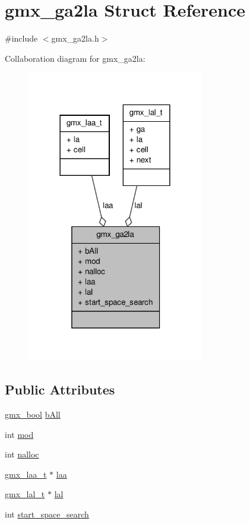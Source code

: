 \hypertarget{structgmx__ga2la}{\section{gmx\-\_\-ga2la \-Struct \-Reference}
\label{structgmx__ga2la}
}


{\ttfamily \#include $<$gmx\-\_\-ga2la.\-h$>$}



\-Collaboration diagram for gmx\-\_\-ga2la\-:
\nopagebreak
\begin{figure}[H]
\begin{center}
\leavevmode
\includegraphics[width=218pt]{structgmx__ga2la__coll__graph}
\end{center}
\end{figure}
\subsection*{\-Public \-Attributes}
\begin{DoxyCompactItemize}
\item 
\hyperlink{include_2types_2simple_8h_a8fddad319f226e856400d190198d5151}{gmx\-\_\-bool} \hyperlink{structgmx__ga2la_a03196e17ef59a80743c6937ed2a70fa4}{b\-All}
\item 
int \hyperlink{structgmx__ga2la_a6ea82b1614fae9a7348931f91d4cbd1c}{mod}
\item 
int \hyperlink{structgmx__ga2la_a2fc212a6fe9ebfdaa46de445c9de58ea}{nalloc}
\item 
\hyperlink{structgmx__laa__t}{gmx\-\_\-laa\-\_\-t} $\ast$ \hyperlink{structgmx__ga2la_a7dd6309c7305c6ae325c1d52d17ba600}{laa}
\item 
\hyperlink{structgmx__lal__t}{gmx\-\_\-lal\-\_\-t} $\ast$ \hyperlink{structgmx__ga2la_a92b7d8241c3c9fc9f325fe468ec9bb66}{lal}
\item 
int \hyperlink{structgmx__ga2la_ace52eb5ca70dde273e46d5465d15d9cd}{start\-\_\-space\-\_\-search}
\end{DoxyCompactItemize}


